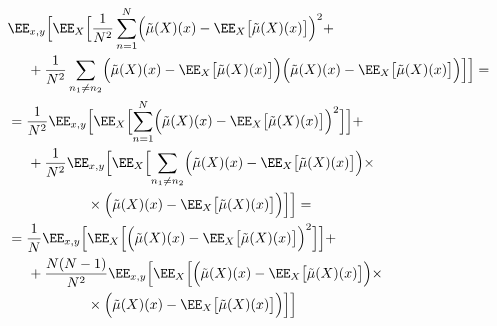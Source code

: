 \documentclass[12pt,fleqn]{article}
\begin{document}
\begin{align*}
    &\EE_{x, y} \Bigl[
        \EE_{X} \Bigl[
            \frac{1}{N^2}
            \sum_{n = 1}^{N} \Bigl(
                \tilde \mu(X)(x)
                -
                \EE_{X} \bigl[
                    \tilde \mu(X)(x)
                \bigr]
            \Bigr)^2
            +\\
            &\text{\hspace{0.5cm}}+
            \frac{1}{N^2}
            \sum_{n_1 \neq n_2} \Bigl(
                \tilde \mu(X)(x)
                -
                \EE_{X} \bigl[
                    \tilde \mu(X)(x)
                \bigr]
            \Bigr)
            \Bigl(
                \tilde \mu(X)(x)
                -
                \EE_{X} \bigl[
                    \tilde \mu(X)(x)
                \bigr]
            \Bigr)
        \Bigr]
    \Bigr]
    =\\
    &=
    \frac{1}{N^2}
    \EE_{x, y} \Bigl[
        \EE_{X} \Bigl[
            \sum_{n = 1}^{N} \Bigl(
                \tilde \mu(X)(x)
                -
                \EE_{X} \bigl[
                    \tilde \mu(X)(x)
                \bigr]
            \Bigr)^2
        \Bigr]
    \Bigr]
    +\\
    &\text{\hspace{0.5cm}}+
    \frac{1}{N^2}
    \EE_{x, y} \Bigl[
        \EE_{X} \Bigl[
            \sum_{n_1 \neq n_2} \Bigl(
                \tilde \mu(X)(x)
                -
                \EE_{X} \bigl[
                    \tilde \mu(X)(x)
                \bigr]
            \Bigr)
            \times\\
            &\text{\hspace{2cm}}\times
            \Bigl(
                \tilde \mu(X)(x)
                -
                \EE_{X} \bigl[
                    \tilde \mu(X)(x)
                \bigr]
            \Bigr)
        \Bigr]
    \Bigr]
    =\\
    &=
    \frac{1}{N}
    \EE_{x, y} \Bigl[
        \EE_{X} \Bigl[
            \Bigl(
                \tilde \mu(X)(x)
                -
                \EE_{X} \bigl[
                    \tilde \mu(X)(x)
                \bigr]
            \Bigr)^2
        \Bigr]
    \Bigr]
    +\\
    &\text{\hspace{0.5cm}}+
    \frac{N(N-1)}{N^2}
    \EE_{x, y} \Bigl[
        \EE_{X} \Bigl[
            \Bigl(
                \tilde \mu(X)(x)
                -
                \EE_{X} \bigl[
                    \tilde \mu(X)(x)
                \bigr]
            \Bigr)
            \times\\
            &\text{\hspace{2cm}}\times
            \Bigl(
                \tilde \mu(X)(x)
                -
                \EE_{X} \bigl[
                    \tilde \mu(X)(x)
                \bigr]
            \Bigr)
        \Bigr]
    \Bigr]
\end{align*}
\end{document}
